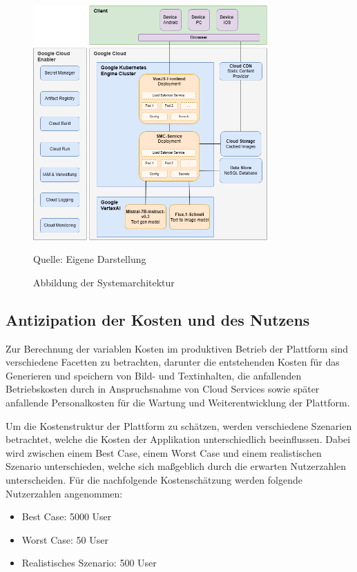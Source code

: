 \begin{figure}[htbp]
    \includegraphics[width=0.8\textwidth]{abbildungen/Drawio/SystemArchitektur}
    \caption{Abbildung der Systemarchitektur}
    \label{fig:sytem-architektur}
    \raggedright Quelle: Eigene Darstellung
\end{figure}

\subsection{Antizipation der Kosten und des Nutzens}

Zur Berechnung der variablen Kosten im produktiven Betrieb der Plattform sind verschiedene Facetten zu betrachten, darunter die entstehenden Kosten für das Generieren und
speichern von Bild- und Textinhalten, die anfallenden Betriebskosten durch in Anspruchsnahme von Cloud Services sowie später anfallende Personalkosten für die Wartung und Weiterentwicklung der Plattform.

Um die Kostenstruktur der Plattform zu schätzen, werden verschiedene Szenarien betrachtet, welche die Kosten der Applikation unterschiedlich beeinflussen.
Dabei wird zwischen einem Best Case, einem Worst Case und einem realistischen Szenario unterschieden, welche sich maßgeblich durch die erwarten Nutzerzahlen unterscheiden.
Für die nachfolgende Kostenschätzung werden folgende Nutzerzahlen angenommen:

\begin{itemize}
    \item Best Case: 5000 User
    \item Worst Case: 50 User
    \item Realistisches Szenario: 500 User
\end{itemize}


